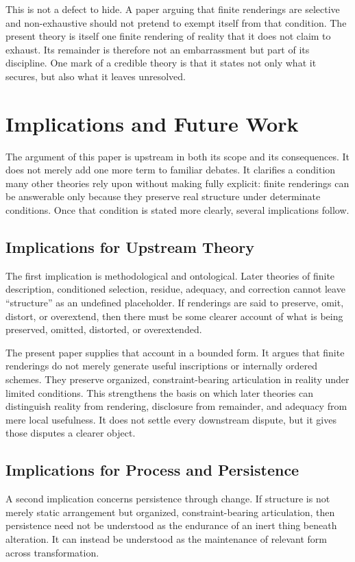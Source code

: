 \documentclass[11pt]{article}
\begin{document}
This is not a defect to hide. A paper arguing that finite renderings are selective and non-exhaustive should not pretend to exempt itself from that condition. The present theory is itself one finite rendering of reality that it does not claim to exhaust. Its remainder is therefore not an embarrassment but part of its discipline. One mark of a credible theory is that it states not only what it secures, but also what it leaves unresolved.
\section{Implications and Future Work}

The argument of this paper is upstream in both its scope and its consequences. It does not merely add one more term to familiar debates. It clarifies a condition many other theories rely upon without making fully explicit: finite renderings can be answerable only because they preserve real structure under determinate conditions. Once that condition is stated more clearly, several implications follow.

\subsection{Implications for Upstream Theory}

The first implication is methodological and ontological. Later theories of finite description, conditioned selection, residue, adequacy, and correction cannot leave ``structure'' as an undefined placeholder. If renderings are said to preserve, omit, distort, or overextend, then there must be some clearer account of what is being preserved, omitted, distorted, or overextended.

The present paper supplies that account in a bounded form. It argues that finite renderings do not merely generate useful inscriptions or internally ordered schemes. They preserve organized, constraint-bearing articulation in reality under limited conditions. This strengthens the basis on which later theories can distinguish reality from rendering, disclosure from remainder, and adequacy from mere local usefulness. It does not settle every downstream dispute, but it gives those disputes a clearer object.

\subsection{Implications for Process and Persistence}

A second implication concerns persistence through change. If structure is not merely static arrangement but organized, constraint-bearing articulation, then persistence need not be understood as the endurance of an inert thing beneath alteration. It can instead be understood as the maintenance of relevant form across transformation.
\end{document}
